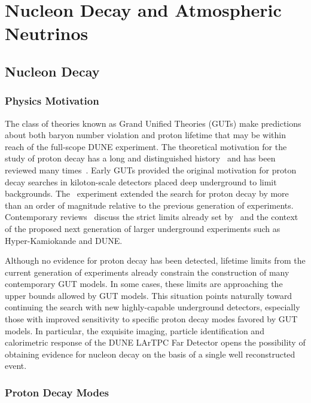 \chapter{Nucleon Decay and Atmospheric Neutrinos}
\label{ch:physics-atmpdk}

\section{Nucleon Decay}
\label{sec:physics-atmpdk-ndk}

\subsection{Physics Motivation}
The class of theories known as Grand Unified Theories (GUTs) make
predictions about both baryon number violation and proton lifetime
that may be within reach of the full-scope DUNE experiment.
%
The theoretical motivation for the study of proton decay has a long and
distinguished history~\cite{Pati:1973rp,Georgi:1974sy,Dimopoulos:1981dw} and
has been reviewed many times~\cite{Langacker:1980js,deBoer:1994dg,Nath:2006ut}.
%
Early GUTs provided the original motivation for proton decay searches in
kiloton-scale detectors placed deep underground to limit backgrounds.  The
 \superk\ experiment extended the search for proton decay by more
than an order of magnitude relative to the previous generation of experiments.
%
Contemporary reviews~\cite{Raby:2008pd,Senjanovic:2009kr,Li:2010dp} discuss the
strict limits already set by \superk\ and the context of the proposed next
generation of larger underground
experiments such as Hyper-Kamiokande and DUNE.

Although no evidence for proton decay has been detected, lifetime
limits from the current generation of experiments already constrain
the construction of many contemporary GUT models. 
In some cases, these limits are approaching the upper bounds allowed 
by GUT models.  This situation points naturally toward continuing 
the search with new highly-capable underground detectors, especially those 
with improved sensitivity to specific proton decay modes favored by GUT models.
In particular, the exquisite imaging, particle identification and calorimetric 
response of the DUNE LArTPC Far Detector opens the possibility of obtaining 
evidence for nucleon decay on the basis of a single well reconstructed event.

\subsection{Proton Decay Modes} 

